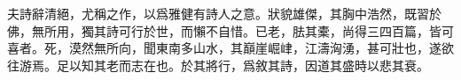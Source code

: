 夫詩辭清絕，尤稱之作，以爲雅健有詩人之意。狀貌雄傑，其胸中浩然，既習於佛，無所用，獨其詩可行於世，而懶不自惜。已老，胠其橐，尚得三四百篇，皆可喜者。死，漠然無所向，聞東南多山水，其巔崖崛峍，江濤洶湧，甚可壯也，遂欲往游焉。足以知其老而志在也。於其將行，爲敘其詩，因道其盛時以悲其衰。%

\theendnotes

